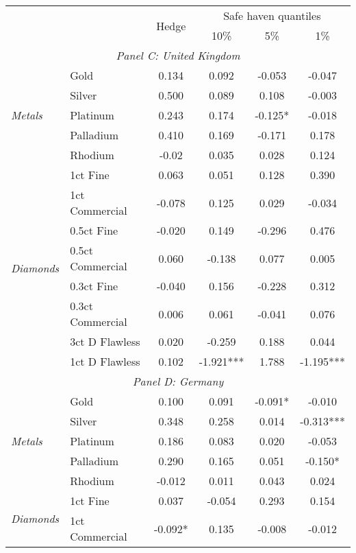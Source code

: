 \begin{tabularx}{1\textwidth}{Xlcccc}
\toprule
 &    & \multirow{2}{*}{Hedge}  & \multicolumn{3}{c}{Safe haven quantiles} \\
\cmidrule(l{0.25em}){4-6} 
     &     &     & 10\% & 5\% & 1\% \\
\midrule
\multicolumn{6}{c}{\emph{Panel C: United Kingdom}} \\
\multirow{5}{*}{\emph{Metals}} & Gold & 0.134 & 0.092 & -0.053 & -0.047 \\
								& Silver & 0.500 & 0.089 & 0.108 & -0.003 \\
								& Platinum & 0.243 & 0.174 & -0.125* & -0.018 \\
								& Palladium & 0.410 & 0.169 & -0.171 & 0.178 \\
								& Rhodium & -0.02 & 0.035 & 0.028 & 0.124 \\
\cmidrule(l{0.25em}){2-6}
\multirow{8}{*}{\emph{Diamonds}} & 1ct Fine & 0.063 & 0.051 & 0.128 & 0.390 \\
								& 1ct Commercial & -0.078 & 0.125 & 0.029 & -0.034 \\
								& 0.5ct Fine & -0.020 & 0.149 & -0.296 & 0.476 \\
								& 0.5ct Commercial & 0.060 & -0.138 & 0.077 & 0.005 \\
								& 0.3ct Fine & -0.040 & 0.156 & -0.228 & 0.312 \\
								& 0.3ct Commercial & 0.006 & 0.061 & -0.041 & 0.076 \\
								& 3ct D Flawless & 0.020 & -0.259 & 0.188 & 0.044 \\
								& 1ct D Flawless & 0.102 & -1.921*** & 1.788 & -1.195*** \\
\midrule
\multicolumn{6}{c}{\emph{Panel D: Germany}} \\
\multirow{5}{*}{\emph{Metals}} & Gold & 0.100 & 0.091 & -0.091* & -0.010 \\
								& Silver & 0.348 & 0.258 & 0.014 & -0.313*** \\
								& Platinum & 0.186 & 0.083 & 0.020 & -0.053 \\
								& Palladium & 0.290 & 0.165 & 0.051 & -0.150* \\
								& Rhodium & -0.012 & 0.011 & 0.043 & 0.024 \\
\cmidrule(l{0.25em}){2-6}
\multirow{8}{*}{\emph{Diamonds}} & 1ct Fine & 0.037 & -0.054 & 0.293 & 0.154 \\
								& 1ct Commercial & -0.092* & 0.135 & -0.008 & -0.012 \\

\end{tabularx}
